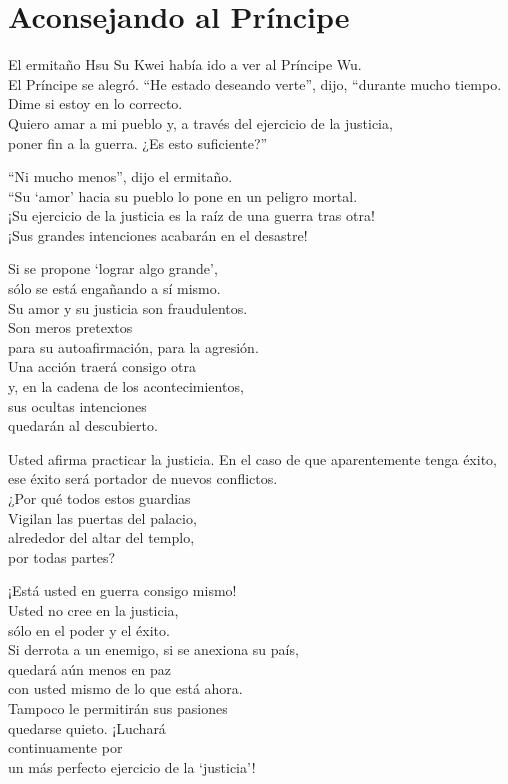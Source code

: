 \documentclass[hidelinks]{memoir}
\begin{document}
	\chapter*{Aconsejando al Príncipe}
	
	El ermitaño Hsu Su Kwei había ido a ver al Príncipe Wu.\\
	El Príncipe se alegró. ``He estado deseando verte'', dijo, ``durante
	mucho tiempo.\\
	Dime si estoy en lo correcto.\\
	Quiero amar a mi pueblo y, a través del ejercicio de la justicia,\\
	poner fin a la guerra. ¿Es esto suficiente?''
	
	``Ni mucho menos'', dijo el ermitaño.\\
	``Su `amor' hacia su pueblo lo pone en un peligro mortal.\\
	¡Su ejercicio de la justicia es la raíz de una guerra tras otra!\\
	¡Sus grandes intenciones acabarán en el desastre!
	
	Si se propone `lograr algo grande',\\
	sólo se está engañando a sí mismo.\\
	Su amor y su justicia son fraudulentos.\\
	Son meros pretextos\\
	para su autoafirmación, para la agresión.\\
	Una acción traerá consigo otra\\
	y, en la cadena de los acontecimientos,\\
	sus ocultas intenciones\\
	quedarán al descubierto.
	
	Usted afirma practicar la justicia. En el caso de que aparentemente
	tenga éxito,\\
	ese éxito será portador de nuevos conflictos.\\
	¿Por qué todos estos guardias\\
	Vigilan las puertas del palacio,\\
	alrededor del altar del templo,\\
	por todas partes?
	
	¡Está usted en guerra consigo mismo!\\
	Usted no cree en la justicia,\\
	sólo en el poder y el éxito.\\
	Si derrota a un enemigo, si se anexiona su país,\\
	quedará aún menos en paz\\
	con usted mismo de lo que está ahora.\\
	Tampoco le permitirán sus pasiones\\
	quedarse quieto. ¡Luchará\\
	continuamente por\\
	un más perfecto ejercicio de la `justicia'!
	
\end{document}
